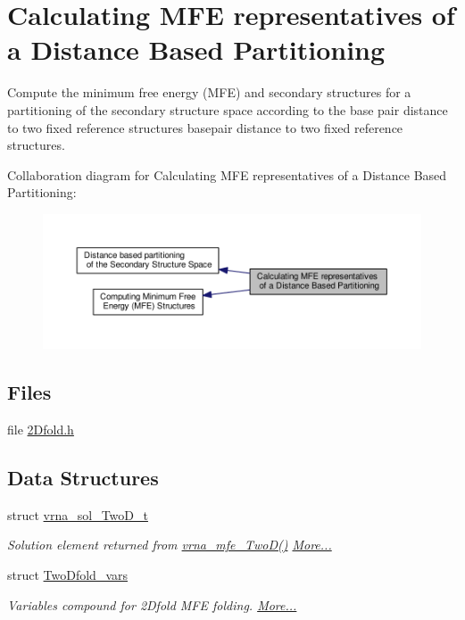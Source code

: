 \hypertarget{group__kl__neighborhood__mfe}{\section{Calculating M\-F\-E representatives of a Distance Based Partitioning}
\label{group__kl__neighborhood__mfe}
}


Compute the minimum free energy (M\-F\-E) and secondary structures for a partitioning of the secondary structure space according to the base pair distance to two fixed reference structures basepair distance to two fixed reference structures.  


Collaboration diagram for Calculating M\-F\-E representatives of a Distance Based Partitioning\-:
\nopagebreak
\begin{figure}[H]
\begin{center}
\leavevmode
\includegraphics[width=350pt]{group__kl__neighborhood__mfe}
\end{center}
\end{figure}
\subsection*{Files}
\begin{DoxyCompactItemize}
\item 
file \hyperlink{2Dfold_8h}{2\-Dfold.\-h}
\end{DoxyCompactItemize}
\subsection*{Data Structures}
\begin{DoxyCompactItemize}
\item 
struct \hyperlink{group__kl__neighborhood__mfe_structvrna__sol__TwoD__t}{vrna\-\_\-sol\-\_\-\-Two\-D\-\_\-t}
\begin{DoxyCompactList}\small\item\em Solution element returned from \hyperlink{group__kl__neighborhood__mfe_ga243c288b463147352829df04de6a2f77}{vrna\-\_\-mfe\-\_\-\-Two\-D()}  \hyperlink{group__kl__neighborhood__mfe_structvrna__sol__TwoD__t}{More...}\end{DoxyCompactList}\item 
struct \hyperlink{group__kl__neighborhood__mfe_structTwoDfold__vars}{Two\-Dfold\-\_\-vars}
\begin{DoxyCompactList}\small\item\em Variables compound for 2\-Dfold M\-F\-E folding.  \hyperlink{group__kl__neighborhood__mfe_structTwoDfold__vars}{More...}\end{DoxyCompactList}\end{DoxyCompactItemize}
